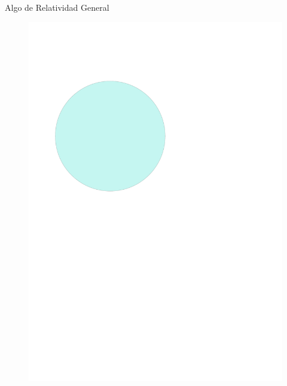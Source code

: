 \documentclass[11pt]{beamer}
\begin{document}
\begin{frame}{Algo de Relatividad General}
    \begin{figure}
        \centering
        \includegraphics[page=3,scale=0.65]{GR.pdf}
    \end{figure}
\end{frame}
\end{document}

